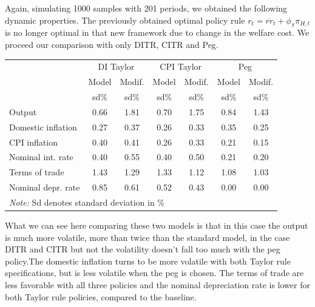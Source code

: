 \documentclass{article}
\begin{document}
\begin{minipage}{0.67\textwidth}
    Again, simulating 1000 samples with 201 periods, we obtained the following dynamic properties. The previously obtained optimal policy rule $r_t = \overline{rr}_t + \phi_\pi \pi_{H,t}$ is no longer optimal in that new framework due to change in the welfare cost. We proceed our comparison with only DITR, CITR and Peg.
    \begin{table}[H]
        \centering
        \begin{tabular}{lcccccc}
            \hline
            & \multicolumn{2}{c}{DI Taylor} & \multicolumn{2}{c}{CPI Taylor} & \multicolumn{2}{c}{Peg}\\
            & Model & Modif.  & Model & Modif.  & Model & Modif. \\
            &  sd\% & sd\% & sd\% & sd\% & sd\% & sd\% \\
            \hline
            Output &  0.66 & 1.81 & 0.70 & 1.75 & 0.84 & 1.43 \\
            Domestic inflation & 0.27 & 0.37 & 0.26 & 0.33 & 0.35 & 0.25 \\
            CPI inflation & 0.40 & 0.41 & 0.26 & 0.33 & 0.21 & 0.15 \\
            Nominal int. rate & 0.40 & 0.55 & 0.40 & 0.50 & 0.21 & 0.20 \\
            Terms of trade & 1.43 & 1.29 & 1.33 & 1.12 & 1.08 & 1.03 \\
            Nominal depr. rate & 0.85 & 0.61 & 0.52 & 0.43 & 0.00 & 0.00 \\
            \hline
            \multicolumn{5}{l}{\textit{Note: } Sd denotes standard deviation in \%}
        \end{tabular}
    \end{table}
\end{minipage}
\begin{minipage}{0.02\textwidth}
\end{minipage}
\begin{minipage}{0.30\textwidth}
    What we can see here comparing these two models is that in this case the output is much more volatile, more than twice than the standard model, in the case DITR and CITR but not the volatility doesn't fall too much with the peg policy.The domestic inflation turns to be more volatile with both Taylor rule specifications, but is less volatile when the peg is chosen. The terms of trade are less favorable with all three policies and the nominal depreciation rate is lower for both Taylor rule policies, compared to the baseline.
\end{minipage}
\end{document}
